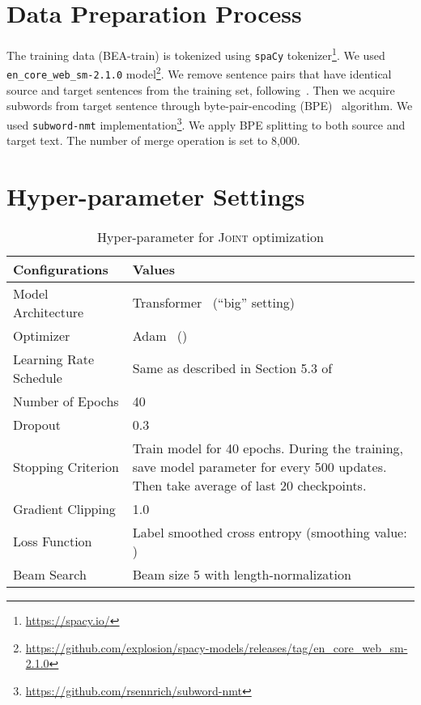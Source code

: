 \documentclass[11pt,a4paper]{article}
\newcommand{\joint}{\textsc{Joint}}
\begin{document}
\section{Data Preparation Process}
\label{appendix:data-preparation-process}
The training data (BEA-train) is tokenized using \texttt{spaCy} tokenizer\footnote{\url{https://spacy.io/}}.
We used \texttt{en\_core\_web\_sm-2.1.0} model\footnote{\url{https://github.com/explosion/spacy-models/releases/tag/en_core_web_sm-2.1.0}}.
We remove sentence pairs that have identical source and target sentences from the training set, following~\citep{chollampatt:2018:AAAI}.
Then we acquire subwords from target sentence through byte-pair-encoding (BPE)~\citep{sennrich:2016:ACL} algorithm.
We used \texttt{subword-nmt} implementation\footnote{\url{https://github.com/rsennrich/subword-nmt}}.
We apply BPE splitting to both source and target text.
The number of merge operation is set to 8,000.


\newpage
\section{Hyper-parameter Settings}
\label{appendix:hyper-parameter-settings}


\begin{table}[h]
\centering
\small
\begin{tabular}{@{}lp{105mm}@{}}
\toprule
   Configurations         &   Values \\ \midrule
   Model Architecture     &   Transformer~\citep{vaswani:2017:NIPS} (``big'' setting)    \\
   Optimizer              &   Adam~\citep{kingma:2015:ICLR}  ()  \\
   Learning Rate Schedule &   Same as described in Section 5.3 of \citet{vaswani:2017:NIPS}     \\
   Number of Epochs       &   40   \\
   Dropout                &   0.3  \\
   Stopping Criterion     &   Train model for 40 epochs. During the training, save model parameter for every 500 updates. Then take average of last 20 checkpoints.     \\ 
   Gradient Clipping      &   1.0  \\
   Loss Function          &   Label smoothed cross entropy (smoothing value: )~\citep{szegedy:2016:rethinking}     \\
   Beam Search            &   Beam size 5 with length-normalization    \\
   \bottomrule
\end{tabular}
\caption{Hyper-parameter for \joint{} optimization}
\label{tab:my-table}
\end{table}
\end{document}
